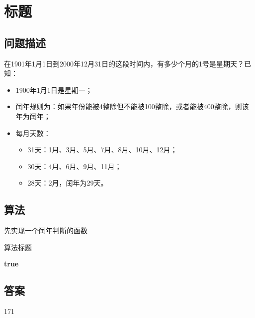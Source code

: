 \section{标题}
\subsection{问题描述}
\begin{tcolorbox}
在1901年1月1日到2000年12月31日的这段时间内，有多少个月的1号是星期天？已知：
\begin{itemize}
    \item 1900年1月1日是星期一；
    \item 闰年规则为：如果年份能被4整除但不能被100整除，或者能被400整除，则该年为闰年；
    \item 每月天数：
    \begin{itemize}
        \item 31天：1月、3月、5月、7月、8月、10月、12月；
        \item 30天：4月、6月、9月、11月；
        \item 28天：2月，闰年为29天。
    \end{itemize}
\end{itemize}
\end{tcolorbox}

\subsection{算法}
先实现一个闰年判断的函数
\begin{algorithm}
	\caption{算法标题}
	\begin{algorithmic}[1]
		\Return \textbf{true}
	\EndIf
	\end{algorithmic}
\end{algorithm}

\subsection{答案}
171
